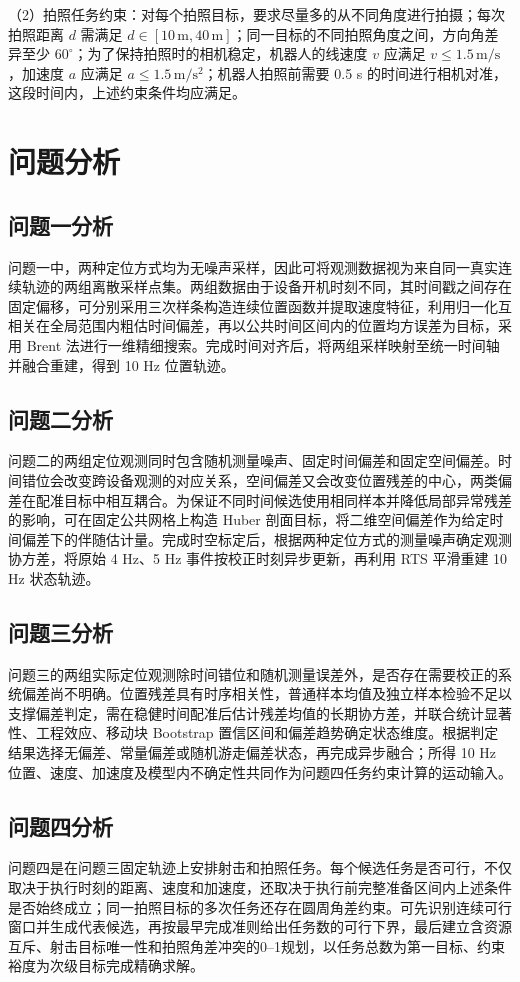{\heiti （2）拍照任务约束：}对每个拍照目标，要求尽量多的从不同角度进行拍摄；每次拍照距离 $d$ 需满足 $d\in[10\,\mathrm{m},40\,\mathrm{m}]$；同一目标的不同拍照角度之间，方向角差异至少 $60^\circ$；为了保持拍照时的相机稳定，机器人的线速度 $v$ 应满足 $v\leq 1.5\,\mathrm{m/s}$，加速度 $a$ 应满足 $a\leq 1.5\,\mathrm{m/s^2}$；机器人拍照前需要 0.5 s 的时间进行相机对准，这段时间内，上述约束条件均应满足。

\section{问题分析}

\subsection{问题一分析}
问题一中，两种定位方式均为无噪声采样，因此可将观测数据视为来自同一真实连续轨迹的两组离散采样点集。两组数据由于设备开机时刻不同，其时间戳之间存在固定偏移，可分别采用三次样条构造连续位置函数并提取速度特征，利用归一化互相关在全局范围内粗估时间偏差，再以公共时间区间内的位置均方误差为目标，采用 Brent 法进行一维精细搜索。完成时间对齐后，将两组采样映射至统一时间轴并融合重建，得到 10 Hz 位置轨迹。

\subsection{问题二分析}
问题二的两组定位观测同时包含随机测量噪声、固定时间偏差和固定空间偏差。时间错位会改变跨设备观测的对应关系，空间偏差又会改变位置残差的中心，两类偏差在配准目标中相互耦合。为保证不同时间候选使用相同样本并降低局部异常残差的影响，可在固定公共网格上构造 Huber 剖面目标，将二维空间偏差作为给定时间偏差下的伴随估计量。完成时空标定后，根据两种定位方式的测量噪声确定观测协方差，将原始 4 Hz、5 Hz 事件按校正时刻异步更新，再利用 RTS 平滑重建 10 Hz 状态轨迹。

\subsection{问题三分析}
问题三的两组实际定位观测除时间错位和随机测量误差外，是否存在需要校正的系统偏差尚不明确。位置残差具有时序相关性，普通样本均值及独立样本检验不足以支撑偏差判定，需在稳健时间配准后估计残差均值的长期协方差，并联合统计显著性、工程效应、移动块 Bootstrap 置信区间和偏差趋势确定状态维度。根据判定结果选择无偏差、常量偏差或随机游走偏差状态，再完成异步融合；所得 10 Hz 位置、速度、加速度及模型内不确定性共同作为问题四任务约束计算的运动输入。

\subsection{问题四分析}
问题四是在问题三固定轨迹上安排射击和拍照任务。每个候选任务是否可行，不仅取决于执行时刻的距离、速度和加速度，还取决于执行前完整准备区间内上述条件是否始终成立；同一拍照目标的多次任务还存在圆周角差约束。可先识别连续可行窗口并生成代表候选，再按最早完成准则给出任务数的可行下界，最后建立含资源互斥、射击目标唯一性和拍照角差冲突的0--1规划，以任务总数为第一目标、约束裕度为次级目标完成精确求解。
